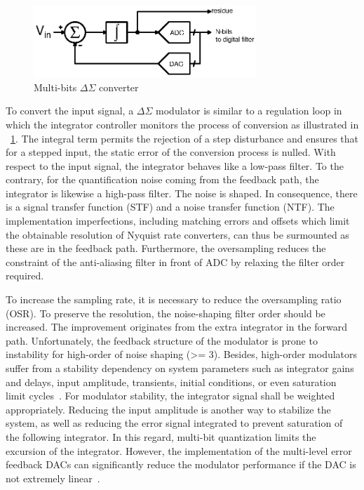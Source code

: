 \begin{figure}[htp]
	\centering
	\includegraphics[width=0.75\textwidth]{Chapter2/Figs/Vector/sigma-delta.ps}
	\caption{Multi-bits $\Delta\Sigma$ converter}
	\label{fig:multi-bit}
\end{figure}

To convert the input signal, a $\Delta\Sigma$ modulator is similar to a regulation loop in which the integrator controller monitors the process of conversion as illustrated in \figurename~\ref{fig:multi-bit}. The integral term permits the rejection of a step disturbance and ensures that for a stepped input, the static error of the conversion process is nulled. With respect to the input signal, the integrator behaves like a low-pass filter. To the contrary, for the quantification noise coming from the feedback path, the integrator is likewise a high-pass filter. The noise is shaped. In consequence, there is a signal transfer function (STF) and a noise transfer function (NTF). The implementation imperfections, including matching errors and offsets which limit the obtainable resolution of Nyquist rate converters, can thus be surmounted as these are in the feedback path. Furthermore, the oversampling reduces the constraint of the anti-aliasing filter in front of ADC by relaxing the filter order required.

To increase the sampling rate, it is necessary to reduce the oversampling ratio (OSR). To preserve the resolution, the noise-shaping filter order should be increased. The improvement originates from the extra integrator in the forward path. Unfortunately, the feedback structure of the modulator is prone to instability for high-order of noise shaping (>= 3). Besides, high-order modulators suffer from a stability dependency on system parameters such as integrator gains and delays, input amplitude, transients, initial conditions, or even saturation limit cycles~\cite{Hein1993,Baird1994,Steven1996}. For modulator stability, the integrator signal shall be weighted appropriately. Reducing the input amplitude is another way to stabilize the system, as well as reducing the error signal integrated to prevent saturation of the following integrator. In this regard, multi-bit quantization limits the excursion of the integrator. However, the implementation of the multi-level error feedback DACs can significantly reduce the modulator performance if the DAC is not extremely linear~\cite{Medeiro1999}.


